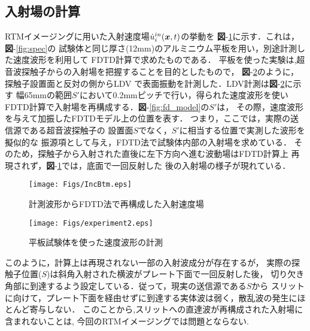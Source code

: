\subsection{入射場の計算}
RTMイメージングに用いた入射速度場$\dot{u}_i^{in}(\boldsymbol{x},t)$の挙動を
{\bf 図}-\ref{fig:inc_btm}に示す．これは，{\bf 図}-\ref{fig:spec}の
試験体と同じ厚さ(12mm)のアルミニウム平板を用い，別途計測した速度波形を利用して
FDTD計算で求めたものである．
平板を使った実験は,超音波探触子からの入射場を把握することを目的としたもので，
{\bf 図}-\ref{fig:experiment2}のように，探触子設置面と反対の側からLDV
で表面振動を計測した．LDV計測は{\bf 図}-\ref{fig:experiment2}に示す
幅65mmの範囲$S'$において0.2mmピッチで行い，得られた速度波形を使い
FDTD計算で入射場を再構成する．{\bf 図}-\ref{fig:fd_model}の$S'$は，
その際，速度波形を与えて加振したFDTDモデル上の位置を表す．
つまり，ここでは，実際の送信源である超音波探触子の
設置面$S$でなく，$S'$に相当する位置で実測した波形を擬似的な
振源項として与え，FDTD法で試験体内部の入射場を求めている．
そのため，探触子から入射された直後に左下方向へ進む波動場はFDTD計算上
再現されず，{\bf 図}-\ref{fig:inc_btm}では，底面で一回反射した
後の入射場の様子が現れている．
\begin{figure}[thb]
\centering
	\texttt{[image: Figs/IncBtm.eps]}
	\caption{計測波形からFDTD法で再構成した入射速度場}
	\label{fig:inc_btm}
\end{figure}
\begin{figure}[hbt]
\centering
	\texttt{[image: Figs/experiment2.eps]}
	\caption{平板試験体を使った速度波形の計測}
	\label{fig:experiment2}
\end{figure}
このように，計算上は再現されない一部の入射波成分が存在するが，
実際の探触子位置($S$)は斜角入射された横波がプレート下面で一回反射した後，
切り欠き角部に到達するよう設定している．従って，現実の送信源である$S$から
スリットに向けて，プレート下面を経由せずに到達する実体波は弱く，散乱波の発生にほとんど寄与しない．
このことから,スリットへの直達波が再構成された入射場に含まれないことは,
今回のRTMイメージングでは問題とならない.

